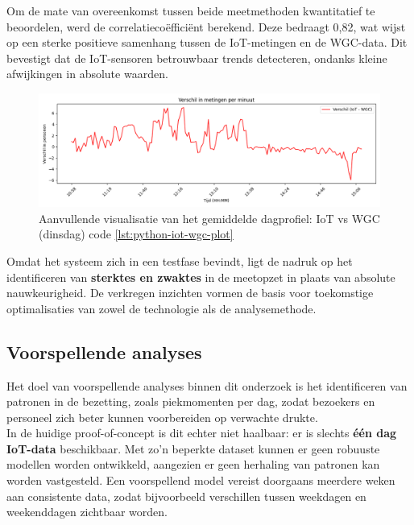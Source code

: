 Om de mate van overeenkomst tussen beide meetmethoden kwantitatief te beoordelen, werd de correlatiecoëfficiënt berekend. Deze bedraagt 0,82, wat wijst op een sterke positieve samenhang tussen de IoT-metingen en de WGC-data. 
Dit bevestigt dat de IoT-sensoren betrouwbaar trends detecteren, ondanks kleine afwijkingen in absolute waarden.


\begin{figure}[htbp]
    \centering
    \includegraphics[width=\textwidth]{img/bp/Figure_2.png}
    \caption{{Aanvullende visualisatie van het gemiddelde dagprofiel: IoT vs WGC (dinsdag) code \ref{lst:python-iot-wgc-plot}}}
    \label{fig:verschil_metingen}
\end{figure}

Omdat het systeem zich in een testfase bevindt, ligt de nadruk op het identificeren van \textbf{sterktes en zwaktes} in de meetopzet in plaats van absolute nauwkeurigheid. De verkregen inzichten vormen de basis voor toekomstige optimalisaties van zowel de technologie als de analysemethode. \\


\subsection{Voorspellende analyses}
Het doel van voorspellende analyses binnen dit onderzoek is het identificeren van patronen in de bezetting, zoals piekmomenten per dag, zodat bezoekers en personeel zich beter kunnen voorbereiden op verwachte drukte. \\

In de huidige proof-of-concept is dit echter niet haalbaar: er is slechts \textbf{één dag IoT-data} beschikbaar. Met zo'n beperkte dataset kunnen er geen robuuste modellen worden ontwikkeld, aangezien er geen herhaling van patronen kan worden vastgesteld. Een voorspellend model vereist doorgaans meerdere weken aan consistente data, zodat bijvoorbeeld verschillen tussen weekdagen en weekenddagen zichtbaar worden. \\ 

